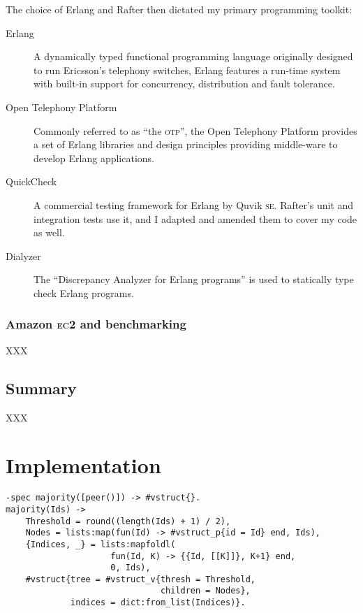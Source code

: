\documentclass[11pt,chapterprefix=true,toc=bibliography,numbers=noendperiod,
               footnotes=multiple,twoside]{scrreprt}
\newcommand{\ECC}[0]{\textsc{ec}2 }
\begin{document}
The choice of Erlang and Rafter then dictated my primary programming toolkit:

\begin{description}
    \item[Erlang] A dynamically typed functional programming language originally designed to run Ericsson's telephony switches, Erlang features a run-time system with built-in support for concurrency, distribution and fault tolerance.
    \item[Open Telephony Platform] Commonly referred to as \enquote{the \textsc{otp}}, the Open Telephony Platform provides a set of Erlang libraries and design principles providing middle-ware to develop Erlang applications.
    \item[QuickCheck] A commercial testing framework for Erlang by Quvik \textsc{se}. Rafter's unit and integration tests use it, and I adapted and amended them to cover my code as well.
    \item[Dialyzer] The \enquote{Discrepancy Analyzer for Erlang programs} is used to statically type check Erlang programs.
\end{description}

\subsection{Amazon \ECC and benchmarking\label{ssc:ec2-benchmarking}}

XXX

\section{Summary}

XXX

\chapter{Implementation\label{ch:implementation}}


\begin{lstlisting}[style=erlang, caption={Majority Protocol voting structure generator code}, label=lst:majority, float=htpb]
-spec majority([peer()]) -> #vstruct{}.
majority(Ids) ->
    Threshold = round((length(Ids) + 1) / 2),
    Nodes = lists:map(fun(Id) -> #vstruct_p{id = Id} end, Ids),
    {Indices, _} = lists:mapfoldl(
                     fun(Id, K) -> {{Id, [[K]]}, K+1} end,
                     0, Ids),
    #vstruct{tree = #vstruct_v{thresh = Threshold,
                               children = Nodes},
             indices = dict:from_list(Indices)}.
\end{lstlisting}
\end{document}
